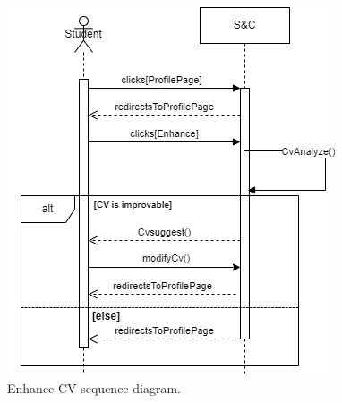 \begin{figure}[H]
    \begin{center}
        \includegraphics[width=1\linewidth]{Images/image3.png}
        \caption{Enhance CV sequence diagram.}
        \label{fig:enhance_CV_seqdiag}%
    \end{center}
\end{figure}


